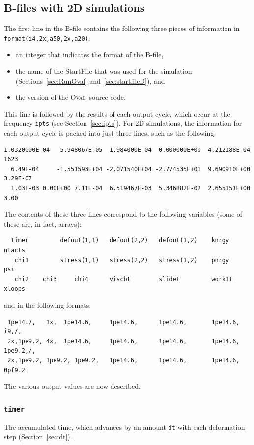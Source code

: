 \documentclass[letterpaper,11pt]{article}
\newcommand{\Oval}{\textsc{Oval}}
\begin{document}
\subsection{B-files with 2D simulations}\label{sec:bfile2d}
The first line in the B-file contains the following 
three pieces of information in \texttt{format(i4,2x,a50,2x,a20)}:
\begin{itemize}
\item
an integer that indicates the format of the B-file,
\item
the name of the \textsf{StartFile} that was used for the simulation
(Sections~\ref{sec:RunOval} and~\ref{sec:startfileD}), and
\item
the version of the \Oval\ source code.
\end{itemize}
This line is followed by the results of each output cycle,
which occur
at the frequency \texttt{ipts} (see Section~\ref{sec:ipts}).
For 2D simulations, the information for each output cycle is packed
into just three lines, such as the following:
\par\noindent
\footnotesize\normalfont
\begin{verbatim}
1.0320000E-04   5.948067E-05 -1.984000E-04  0.000000E+00  4.212188E-04     1623
  6.49E-04     -1.551593E+04 -2.071540E+04 -2.774535E+01  9.690910E+00 3.29E-07
  1.03E-03 0.00E+00 7.11E-04  6.519467E-03  5.346882E-02  2.655151E+00     3.00
\end{verbatim}
\normalsize\normalfont
\par
The contents of these three lines
correspond to the following variables (some of these
are, in fact, arrays):
\footnotesize\normalfont
\begin{verbatim}
  timer         defout(1,1)   defout(2,2)   defout(1,2)    knrgy         ntacts
   chi1         stress(1,1)   stress(2,2)   stress(1,2)    pnrgy           psi 
   chi2    chi3     chi4      viscbt        slidet         work1t        xloops
\end{verbatim}
\normalsize\normalfont
and in the following formats:
\footnotesize\normalfont
\begin{verbatim}
 1pe14.7,   1x,  1pe14.6,     1pe14.6,      1pe14.6,       1pe14.6,       i9,/,
 2x,1pe9.2, 4x,  1pe14.6,     1pe14.6,      1pe14.6,       1pe14.6,   1pe9.2,/,
 2x,1pe9.2, 1pe9.2, 1pe9.2,   1pe14.6,      1pe14.6,       1pe14.6,   0pf9.2
\end{verbatim}
\normalsize\normalfont
The various output values are now described.
%
\subsubsection{\texttt{timer}}
The accumulated time, which advances by an amount \texttt{dt} with each
deformation step (Section~\ref{sec:dt}).
%
\end{document}

